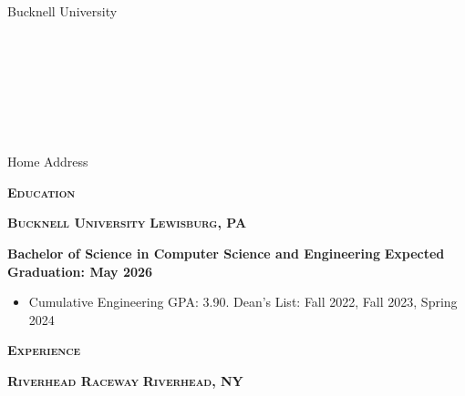 \documentclass{article}
\newlength{\sectspaceabove}
\newlength{\sectspacebelow}
\newcommand{\textscbf}[1]{\textbf{\textsc{#1}}}
\newcommand{\resumesection}[1]{%
    \vspace{\sectspaceabove}%
    \begin{center}
        \textscbf{#1}
    \end{center}%
    \vspace{\sectspacebelow}%
}
\begin{document}
\begin{center}
    {\large \textscbf{\personalName}}
\end{center}

\noindent
\begin{minipage}[t]{0.33\textwidth}
    \raggedright
    Bucknell University
    \ifx\personalSchoolAddress\empty\else
    \\\personalSchoolAddress
    \fi
\end{minipage}%
\begin{minipage}[t]{0.33\textwidth} 
    \centering
    \ifx\personalEmail\empty\else
    \personalEmail
    \fi
    \ifx\personalSchoolEmail\empty\else
    \ifx\personalEmail\empty\else\\\fi
    \personalSchoolEmail
    \fi
    \ifx\personalPhone\empty\else
    \ifx\personalEmail\empty\else\\\fi
    \ifx\personalSchoolEmail\empty\else\\\fi
    \personalPhone
    \fi
    \ifx\personalWebsite\empty\else
    \ifx\personalEmail\empty\else\\\fi
    \ifx\personalSchoolEmail\empty\else\\\fi
    \ifx\personalPhone\empty\else\\\fi
    \href{https://\personalWebsite}{\personalWebsite}
    \fi
\end{minipage}%
\begin{minipage}[t]{0.33\textwidth}
    \raggedleft
    \ifx\personalHomeAddress\empty\else
    Home Address\\
    \personalHomeAddress
    \fi
\end{minipage}

\resumesection{Education}

\textscbf{Bucknell University} \hfill \textscbf{Lewisburg, PA}

\textbf{Bachelor of Science in Computer Science and Engineering} \hfill \textbf{Expected Graduation: May 2026}
\begin{itemize}[noitemsep,topsep=2pt]
    \item Cumulative Engineering GPA: 3.90. Dean's List: Fall 2022, Fall 2023, Spring 2024
\end{itemize}

\resumesection{Experience}

\textscbf{Riverhead Raceway} \hfill \textscbf{Riverhead, NY}
\end{document}
